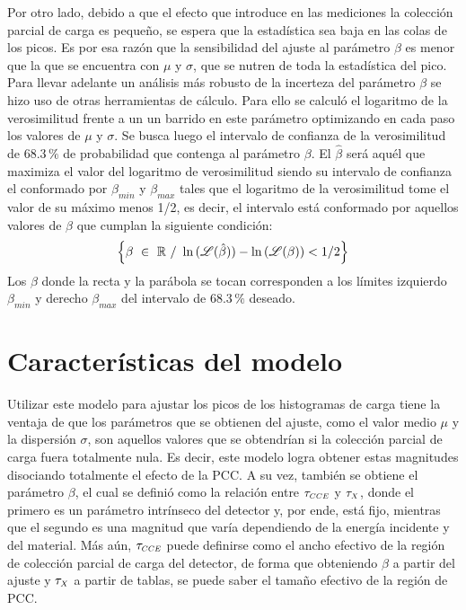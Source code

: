 Por otro lado, debido a que el efecto que introduce en las mediciones la colección parcial de carga es pequeño, se espera que la estadística sea baja en las colas de los picos. Es por esa razón que la sensibilidad del ajuste al parámetro $\beta$ es menor que la que se encuentra con $\mu$ y $\sigma$, que se nutren de toda la estadística del pico. Para llevar adelante un análisis más robusto de la incerteza del parámetro $\beta$ se hizo uso de otras herramientas de cálculo. Para ello se calculó el logaritmo de la verosimilitud frente a un un barrido en este parámetro optimizando en cada paso los valores de $\mu$ y $\sigma$. Se busca luego el intervalo de confianza de la verosimilitud de $68.3\,\%$ de probabilidad que contenga al parámetro $\beta$. El $\hat{\beta}$ será aquél que maximiza el valor del logaritmo de verosimilitud siendo su intervalo de confianza el conformado por $\beta_{min}$ y $\beta_{max}$ tales que el logaritmo de la verosimilitud tome el valor de su máximo menos 1/2, es decir, el intervalo está conformado por aquellos valores de $\beta$ que cumplan la siguiente condición:
\begin{equation*}
    \left\{
        \beta\ \in\ \mathbb{R}\ /\ 
        \ln{(\Lagr(\hat{\beta}))}
        -
        \ln{
            \left(
                \Lagr(\beta)
            \right)
            }
        < 1/2
    \right\}
\end{equation*}
Los $\beta$ donde la recta y la parábola se tocan corresponden a los límites izquierdo $\beta_{min}$ y derecho $\beta_{max}$ del intervalo de $68.3\,\%$ deseado\cite{Frodesen}.


\section{Características del modelo}

\noindent Utilizar este modelo para ajustar los picos de los histogramas de carga tiene la ventaja de que los parámetros que se obtienen del ajuste, como el valor medio $\mu$ y la dispersión $\sigma$, son aquellos valores que se obtendrían si la colección parcial de carga fuera totalmente nula. Es decir, este modelo logra obtener estas magnitudes disociando totalmente el efecto de la PCC. A su vez, también se obtiene el parámetro $\beta$, el cual se definió como la relación entre $\tau_{\scaleto{CCE}{4pt}}$ y $\tau_{\scaleto{X}{4pt}}$, donde el primero es un parámetro intrínseco del detector y, por ende, está fijo, mientras que el segundo es una magnitud que varía dependiendo de la energía incidente y del material. 
Más aún, $\tau_{\scaleto{CCE}{4pt}}$ puede definirse como el ancho efectivo de la región de colección parcial de carga del detector, de forma que obteniendo $\beta$ a partir del ajuste y $\tau_{\scaleto{X}{4pt}}$ a partir de tablas, se puede saber el tamaño efectivo de la región de PCC. 

